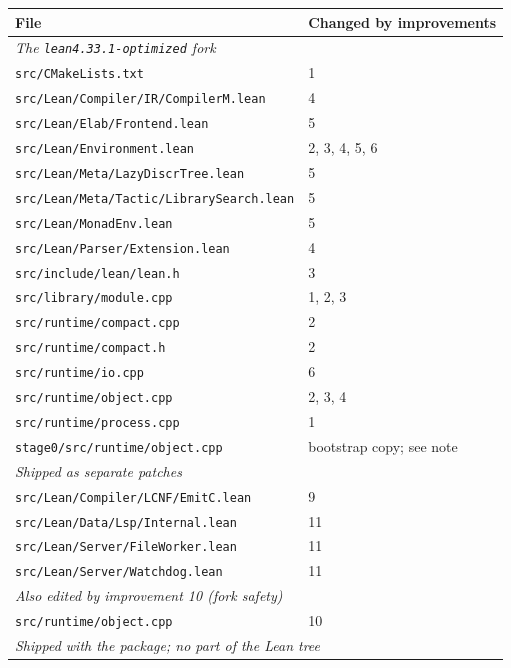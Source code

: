 \documentclass{article}
\newcommand{\Lean}{Lean\xspace}      %
\newcommand{\altlean}{\texttt{lean4.33.1-\allowbreak optimized}\xspace}
\begin{document}
\begin{table}[!ht]
\centering
\footnotesize
\setlength{\tabcolsep}{5pt}
\begin{tabular}{ll}
\toprule
File & Changed by improvements \\
\midrule
\multicolumn{2}{l}{\textit{The \altlean fork}} \\
\quad \texttt{src/CMakeLists.txt} & 1 \\
\quad \texttt{src/Lean/Compiler/IR/CompilerM.lean} & 4 \\
\quad \texttt{src/Lean/Elab/Frontend.lean} & 5 \\
\quad \texttt{src/Lean/Environment.lean} & 2, 3, 4, 5, 6 \\
\quad \texttt{src/Lean/Meta/LazyDiscrTree.lean} & 5 \\
\quad \texttt{src/Lean/Meta/Tactic/LibrarySearch.lean} & 5 \\
\quad \texttt{src/Lean/MonadEnv.lean} & 5 \\
\quad \texttt{src/Lean/Parser/Extension.lean} & 4 \\
\quad \texttt{src/include/lean/lean.h} & 3 \\
\quad \texttt{src/library/module.cpp} & 1, 2, 3 \\
\quad \texttt{src/runtime/compact.cpp} & 2 \\
\quad \texttt{src/runtime/compact.h} & 2 \\
\quad \texttt{src/runtime/io.cpp} & 6 \\
\quad \texttt{src/runtime/object.cpp} & 2, 3, 4 \\
\quad \texttt{src/runtime/process.cpp} & 1 \\
\quad \texttt{stage0/src/runtime/object.cpp} & bootstrap copy; see note \\
\midrule
\multicolumn{2}{l}{\textit{Shipped as separate patches}} \\
\quad \texttt{src/Lean/Compiler/LCNF/EmitC.lean} & 9 \\
\quad \texttt{src/Lean/Data/Lsp/Internal.lean} & 11 \\
\quad \texttt{src/Lean/Server/FileWorker.lean} & 11 \\
\quad \texttt{src/Lean/Server/Watchdog.lean} & 11 \\
\midrule
\multicolumn{2}{l}{\textit{Also edited by improvement 10 (fork safety)}} \\
\quad \texttt{src/runtime/object.cpp} & 10 \\
\midrule
\multicolumn{2}{l}{\textit{Shipped with the package; no part of the \Lean tree}} \\

\end{tabular}
\end{table}
\end{document}

